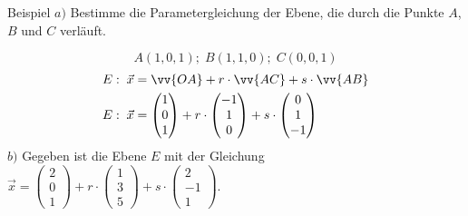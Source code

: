 \documentclass{article}
\begin{document}
\begin{boxx}[DarkBlue]{Beispiel}
    $a)$\hspace{3mm} Bestimme die Parametergleichung der Ebene, die durch die Punkte
    $A$, $B$ und $C$ verläuft.

    \[A(1,0,1);\; B(1,1,0);\; C(0,0,1)\]
    \begin{align*}
        E:\; \vec{x} &= \vv{OA} + r \cdot \vv{AC} + s \cdot \vv{AB} \\
        E:\; \vec{x} &= \begin{pmatrix}1\\0\\1\end{pmatrix} + r \cdot \begin{pmatrix}-1\\1\\0\end{pmatrix} + s \cdot \begin{pmatrix}0\\1\\-1\end{pmatrix} \\
    \end{align*}
    $b)$\hspace{3mm} Gegeben ist die Ebene $E$ mit der Gleichung 
    $\displaystyle \vec{x} = \begin{pmatrix}2\\0\\1\end{pmatrix} + r \cdot \begin{pmatrix}1\\3\\5\end{pmatrix} + s \cdot \begin{pmatrix}2\\-1\\1\end{pmatrix}$.\\


\end{boxx}
\end{document}
